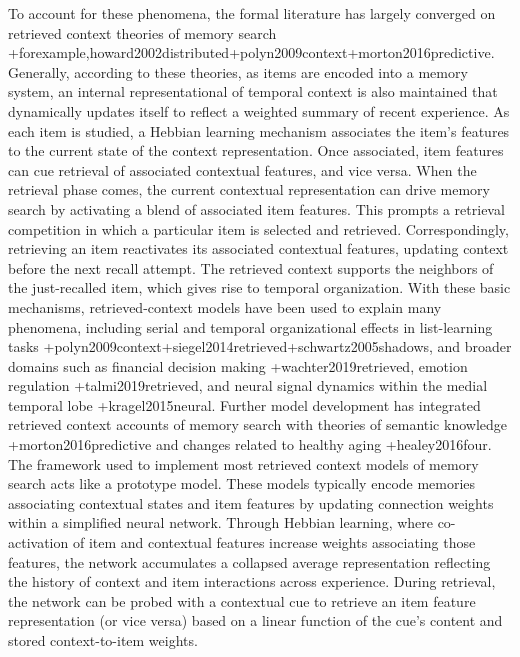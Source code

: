 {}To account for these phenomena, the formal literature has largely converged on retrieved context theories of memory search +{for\markdownRendererNbsp{}example,}{}{howard2002distributed}+{}{}{polyn2009context}+{}{}{morton2016predictive}. Generally, according to these theories, as items are encoded into a memory system, an internal representational of temporal context is also maintained that dynamically updates itself to reflect a weighted summary of recent experience. As each item is studied, a Hebbian learning mechanism associates the item's features to the current state of the context representation. Once associated, item features can cue retrieval of associated contextual features, and vice versa. When the retrieval phase comes, the current contextual representation can drive memory search by activating a blend of associated item features. This prompts a retrieval competition in which a particular item is selected and retrieved. Correspondingly, retrieving an item reactivates its associated contextual features, updating context before the next recall attempt. The retrieved context supports the neighbors of the just-recalled item, which gives rise to temporal organization.\markdownRendererInterblockSeparator
{}With these basic mechanisms, retrieved-context models have been used to explain many phenomena, including serial and temporal organizational effects in list-learning tasks +{}{}{polyn2009context}+{}{}{siegel2014retrieved}+{}{}{schwartz2005shadows}, and broader domains such as financial decision making +{}{}{wachter2019retrieved}, emotion regulation +{}{}{talmi2019retrieved}, and neural signal dynamics within the medial temporal lobe +{}{}{kragel2015neural}. Further model development has integrated retrieved context accounts of memory search with theories of semantic knowledge +{}{}{morton2016predictive} and changes related to healthy aging +{}{}{healey2016four}.\markdownRendererInterblockSeparator
{}The framework used to implement most retrieved context models of memory search acts like a prototype model. These models typically encode memories associating contextual states and item features by updating connection weights within a simplified neural network. Through Hebbian learning, where co-activation of item and contextual features increase weights associating those features, the network accumulates a collapsed average representation reflecting the history of context and item interactions across experience. During retrieval, the network can be probed with a contextual cue to retrieve an item feature representation (or vice versa) based on a linear function of the cue's content and stored context-to-item weights.\markdownRendererInterblockSeparator
